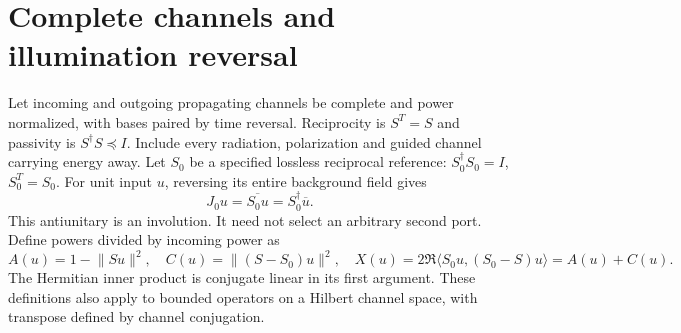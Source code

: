 \documentclass[11pt,a4paper]{article}
\theoremstyle{remark}
\newcommand{\norm}[1]{\lVert #1\rVert}
\newcommand{\ip}[2]{\langle #1,#2\rangle}
\begin{document}
\section{Complete channels and illumination reversal}\label{sec:channels}
Let incoming and outgoing propagating channels be complete and power normalized, with bases paired by time reversal. Reciprocity is $S^T=S$ and passivity is $S^\dagger S\preceq I$. Include every radiation, polarization and guided channel carrying energy away. Let $S_0$ be a specified lossless reciprocal reference: $S_0^\dagger S_0=I$, $S_0^T=S_0$. For unit input $u$, reversing its entire background field gives
\begin{equation}\label{eq:reverse}
 J_0u=\overline{S_0u}=S_0^\dagger\overline u.
\end{equation}
This antiunitary is an involution. It need not select an arbitrary second port. Define powers divided by incoming power as
\begin{equation}\label{eq:channel-powers}
 A(u)=1-\norm{Su}^2,\quad C(u)=\norm{(S-S_0)u}^2,\quad
 X(u)=2\Re\ip{S_0u}{(S_0-S)u}=A(u)+C(u).
\end{equation}
The Hermitian inner product is conjugate linear in its first argument. These definitions also apply to bounded operators on a Hilbert channel space, with transpose defined by channel conjugation.
\end{document}

